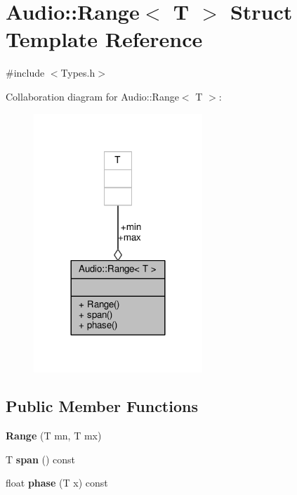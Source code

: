 \hypertarget{structAudio_1_1Range}{}\section{Audio\+:\+:Range$<$ T $>$ Struct Template Reference}
\label{structAudio_1_1Range}


{\ttfamily \#include $<$Types.\+h$>$}



Collaboration diagram for Audio\+:\+:Range$<$ T $>$\+:
\nopagebreak
\begin{figure}[H]
\begin{center}
\leavevmode
\includegraphics[width=180pt]{d7/d06/structAudio_1_1Range__coll__graph}
\end{center}
\end{figure}
\subsection*{Public Member Functions}
\begin{DoxyCompactItemize}
\item 
{\bfseries Range} (T mn, T mx)\hypertarget{structAudio_1_1Range_acad4d3a7eb16f2950e20bb7af265da66}{}\label{structAudio_1_1Range_acad4d3a7eb16f2950e20bb7af265da66}

\item 
T {\bfseries span} () const \hypertarget{structAudio_1_1Range_a1d66c06f10eeed3a4f21c89e47e73c76}{}\label{structAudio_1_1Range_a1d66c06f10eeed3a4f21c89e47e73c76}

\item 
float {\bfseries phase} (T x) const \hypertarget{structAudio_1_1Range_a63dc74160a4df9a9f7c6fa953d401894}{}\label{structAudio_1_1Range_a63dc74160a4df9a9f7c6fa953d401894}

\end{DoxyCompactItemize}
